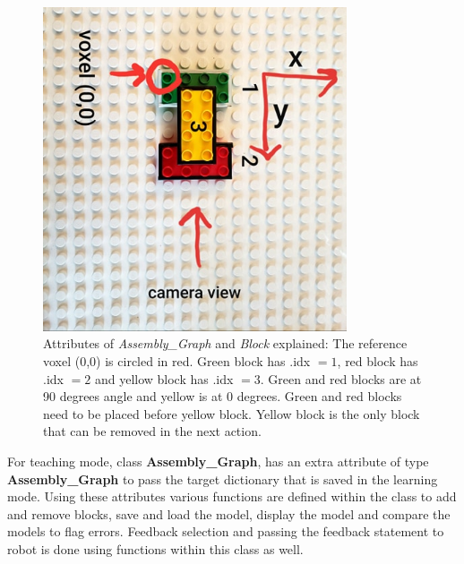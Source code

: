 \begin{figure}[h]
   \centering
   \includegraphics[width = 0.8\textwidth]{figures/voxel_3objs.jpg}
   \caption[{Attributes of \emph{Assembly\_Graph} and \emph{Block} explained}]{Attributes of \emph{Assembly\_Graph} and \emph{Block} explained: The reference voxel (0,0) is circled in red. Green block has .idx $=1$, red block has .idx $= 2$ and yellow block has .idx $= 3$. Green and red blocks are at 90 degrees angle and yellow is at 0 degrees. Green and red blocks need to be placed before yellow block. Yellow block is the only block that can be removed in the next action.}
   \label{fig:fig_3-2}
\end{figure}

For teaching mode, class \textbf{Assembly\_Graph}, has an extra attribute of type \textbf{Assembly\_Graph} to pass the target dictionary that is saved in the learning mode. Using these attributes various functions are defined within the class to add and remove blocks, save and load the model, display the model and compare the models to flag errors. Feedback selection and passing the feedback statement to robot is done using functions within this class as well. 

